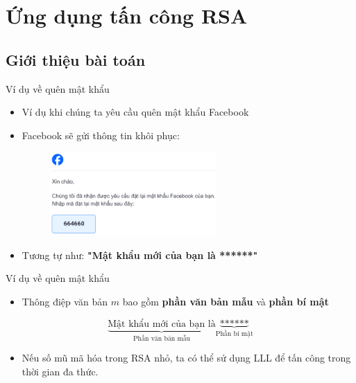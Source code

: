 \section{Ứng dụng tấn công RSA}

\subsection{Giới thiệu bài toán}

\begin{frame}{Ví dụ về quên mật khẩu}

\begin{itemize}
\item Ví dụ khi chúng ta yêu cầu quên mật khẩu Facebook
\item Facebook sẽ gửi thông tin khôi phục:

\begin{figure}[h]
\includegraphics[width=0.6\textwidth]{pictures/facebook.png}
\end{figure}

\item Tương tự như: \textbf{"Mật khẩu mới của bạn là ******"}
\end{itemize}

\end{frame}
\begin{frame}{Ví dụ về quên mật khẩu}

\begin{itemize}
\item Thông điệp văn bản \(m \) bao gồm \textbf{phần văn bản mẫu} và \textbf{phần bí mật}
\end{itemize}

$$
\underbrace{\text{Mật khẩu mới của bạn là}}_{\text{Phần văn bản mẫu}}
\underbrace{\text{******}}_{\text{Phần bí mật}}
$$

\begin{itemize}
\item Nếu số mũ mã hóa trong RSA nhỏ, ta có thể sử dụng LLL để tấn công trong thời gian đa thức.
\end{itemize}

\end{frame}
